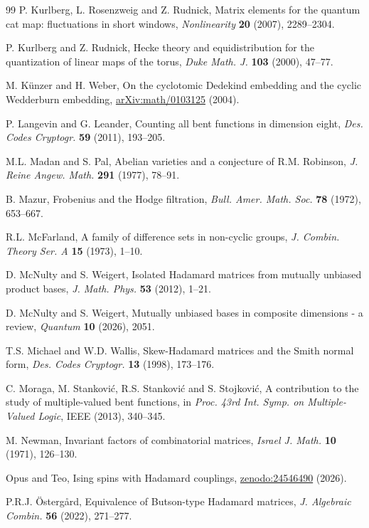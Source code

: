 \documentclass[11pt]{amsart}
\theoremstyle{definition}
\begin{document}
\begin{thebibliography}{99}
P. Kurlberg, L. Rosenzweig and Z. Rudnick, Matrix elements for the quantum cat map: fluctuations in short windows, {\em Nonlinearity} {\bf 20} (2007), 2289--2304.

P. Kurlberg and Z. Rudnick, Hecke theory and equidistribution for the quantization of linear maps of the torus, {\em Duke Math. J.} {\bf 103} (2000), 47--77.

M. K\"unzer and H. Weber, On the cyclotomic Dedekind embedding and the cyclic Wedderburn embedding, \mbox{\href{https://arxiv.org/pdf/math/0103125}{arXiv:math/0103125}} (2004).

P. Langevin and G. Leander, Counting all bent functions in dimension eight, {\em Des. Codes Cryptogr.} {\bf 59} (2011), 193--205.

M.L. Madan and S. Pal, Abelian varieties and a conjecture of R.M. Robinson, {\em J. Reine Angew. Math.} {\bf 291} (1977), 78--91.

B. Mazur, Frobenius and the Hodge filtration, {\em Bull. Amer. Math. Soc.} {\bf 78} (1972), 653--667.

R.L. McFarland, A family of difference sets in non-cyclic groups, {\em J. Combin. Theory Ser. A} {\bf 15} (1973), 1--10.

D. McNulty and S. Weigert, Isolated Hadamard matrices from mutually unbiased product bases, {\em J. Math. Phys.} {\bf 53} (2012), 1--21.

D. McNulty and S. Weigert, Mutually unbiased bases in composite dimensions - a review, {\em Quantum} {\bf 10} (2026), 2051.

T.S. Michael and W.D. Wallis, Skew-Hadamard matrices and the Smith normal form, {\em Des. Codes Cryptogr.} {\bf 13} (1998), 173--176.

C. Moraga, M. Stankovi\'c, R.S. Stankovi\'c and S. Stojkovi\'c, A contribution to the study of multiple-valued bent functions, in {\em Proc. 43rd Int. Symp. on Multiple-Valued Logic}, IEEE (2013), 340--345.

M. Newman, Invariant factors of combinatorial matrices, {\em Israel J. Math.} {\bf 10} (1971), 126--130.

Opus and Teo, Ising spins with Hadamard couplings, \mbox{\href{https://zenodo.org/records/24546490}{zenodo:24546490}} (2026).

P.R.J. \"Osterg\aa rd, Equivalence of Butson-type Hadamard matrices, {\em J. Algebraic Combin.} {\bf 56} (2022), 271--277.


\end{thebibliography}
\end{document}
